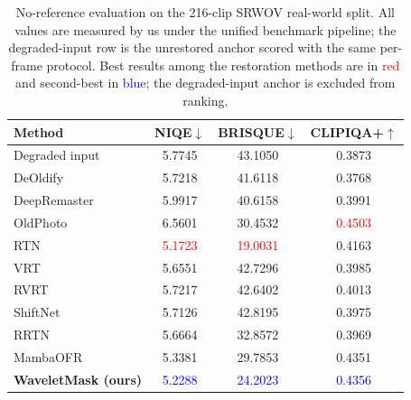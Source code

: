 \begin{table}[H]
\caption{No-reference evaluation on the 216-clip SRWOV real-world split. All values are measured by us under the unified benchmark pipeline; the degraded-input row is the unrestored anchor scored with the same per-frame protocol. Best results among the restoration methods are in \textcolor{red}{red} and second-best in \textcolor{blue}{blue}; the degraded-input anchor is excluded from ranking.\label{tab:realworld_literature}}
\footnotesize
\begin{tabularx}{\textwidth}{lCCC}
\toprule
\textbf{Method} & \textbf{NIQE$\downarrow$} & \textbf{BRISQUE$\downarrow$} & \textbf{CLIPIQA+$\uparrow$} \\
\midrule
Degraded input                              & 5.7745 & 43.1050 & 0.3873 \\
DeOldify~\cite{jantic2019deoldify}          & 5.7218 & 41.6118 & 0.3768 \\
DeepRemaster~\cite{iizuka2019deepremaster}  & 5.9917 & 40.6158 & 0.3991 \\
OldPhoto~\cite{wan2020bringing}             & 6.5601 & 30.4532 & \textcolor{red}{0.4503} \\
RTN~\cite{rtn2022}                          & \textcolor{red}{5.1723} & \textcolor{red}{19.0031} & 0.4163 \\
VRT~\cite{liang2024vrt}                     & 5.6551 & 42.7296 & 0.3985 \\
RVRT~\cite{liang2022rvrt}                   & 5.7217 & 42.6402 & 0.4013 \\
ShiftNet~\cite{li2023shiftnet}              & 5.7126 & 42.8195 & 0.3975 \\
RRTN~\cite{rrtn2024}                        & 5.6664 & 32.8572 & 0.3969 \\
MambaOFR~\cite{mao2025mambaofr}             & 5.3381 & 29.7853 & 0.4351 \\
\midrule
\textbf{WaveletMask (ours)}                 & \textcolor{blue}{5.2288} & \textcolor{blue}{24.2023} & \textcolor{blue}{0.4356} \\
\bottomrule
\end{tabularx}
\normalsize
\end{table}

